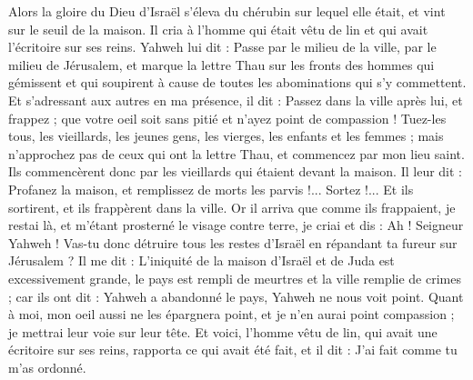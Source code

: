 \begin{multicols}{2}
Alors la gloire du Dieu d'Israël s'éleva du chérubin sur lequel elle était, et vint sur le seuil de la maison. Il cria à l'homme qui était vêtu de lin et qui avait l’écritoire sur ses reins.
Yahweh lui dit : Passe par le milieu de la ville, par le milieu de Jérusalem, et marque la lettre Thau sur les fronts des hommes qui gémissent et qui soupirent à cause de toutes les abominations qui s’y commettent.
Et s’adressant aux autres en ma présence, il dit : Passez dans la ville après lui, et frappez ; que votre oeil soit sans pitié et n'ayez point de compassion !
Tuez-les tous, les vieillards, les jeunes gens, les vierges, les enfants et les femmes ; mais n'approchez pas de ceux qui ont la lettre Thau, et commencez par mon lieu saint. Ils commencèrent donc par les vieillards qui étaient devant la maison.
Il leur dit : Profanez la maison, et remplissez de morts les parvis !... Sortez !... Et ils sortirent, et ils frappèrent dans la ville.
Or il arriva que comme ils frappaient, je restai là, et m'étant prosterné le visage contre terre, je criai et dis : Ah ! Seigneur Yahweh ! Vas-tu donc détruire tous les restes d'Israël en répandant ta fureur sur Jérusalem ?
Il me dit : L'iniquité de la maison d'Israël et de Juda est excessivement grande, le pays est rempli de meurtres et la ville remplie de crimes ; car ils ont dit : Yahweh a abandonné le pays, Yahweh ne nous voit point.
Quant à moi, mon oeil aussi ne les épargnera point, et je n'en aurai point compassion ; je mettrai leur voie sur leur tête.
Et voici, l'homme vêtu de lin, qui avait une écritoire sur ses reins, rapporta ce qui avait été fait, et il dit : J'ai fait comme tu m'as ordonné.

\end{multicols}
